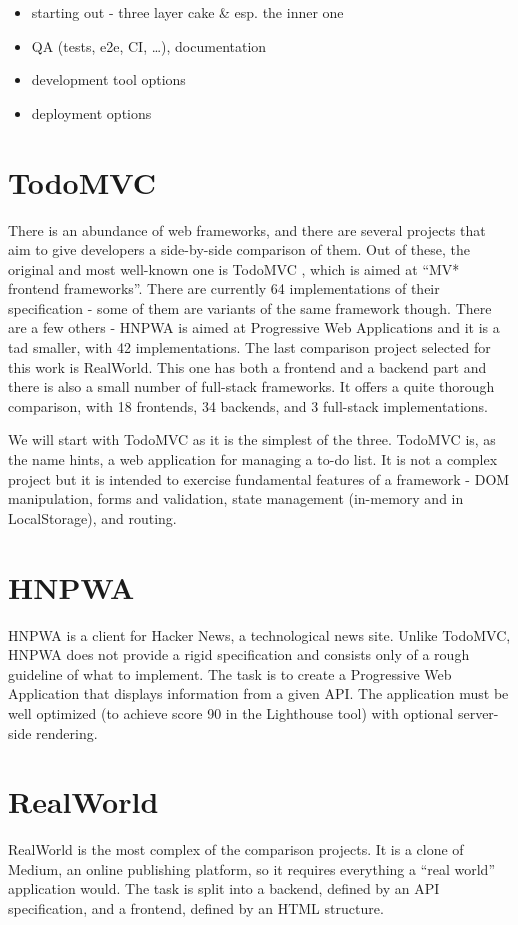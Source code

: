 \documentclass[english,odsaz]{fitthesis}
\begin{document}
\begin{itemize}
\item starting out - three layer cake \& esp. the inner one
\item QA (tests, e2e, CI, \ldots{}), documentation
\item development tool options
\item deployment options
\end{itemize}

\section{TodoMVC}
\label{sec:org4ddd5fc}
There is an abundance of web frameworks, and there are several projects that aim
to give developers a side-by-side comparison of them. Out of these, the original
and most well-known one is TodoMVC \cite{todomvc}, which is aimed at ``MV* frontend
frameworks''. There are currently 64 implementations of their specification -
some of them are variants of the same framework though. There are a few others -
HNPWA is aimed at Progressive Web Applications and it is a tad smaller, with 42
implementations. The last comparison project selected for this work is
RealWorld. This one has both a frontend and a backend part and there is also a
small number of full-stack frameworks. It offers a quite thorough comparison,
with 18 frontends, 34 backends, and 3 full-stack implementations.

We will start with TodoMVC as it is the simplest of the three. TodoMVC is, as
the name hints, a web application for managing a to-do list. It is not a complex
project but it is intended to exercise fundamental features of a framework - DOM
manipulation, forms and validation, state management (in-memory and in
LocalStorage), and routing.

\section{HNPWA}
\label{sec:orgeec1e56}
HNPWA \cite{hnpwa} is a client for Hacker News, a technological news site. Unlike TodoMVC,
HNPWA does not provide a rigid specification and consists only of a rough
guideline of what to implement. The task is to create a Progressive Web
Application that displays information from a given API. The application must be
well optimized (to achieve score 90 in the Lighthouse tool) with optional
server-side rendering.

\section{RealWorld}
\label{sec:orga1fd942}
RealWorld \cite{realworld} is the most complex of the comparison projects. It is a clone of
Medium, an online publishing platform, so it requires everything a ``real world''
application would. The task is split into a backend, defined by an API
specification, and a frontend, defined by an HTML structure.
\end{document}
